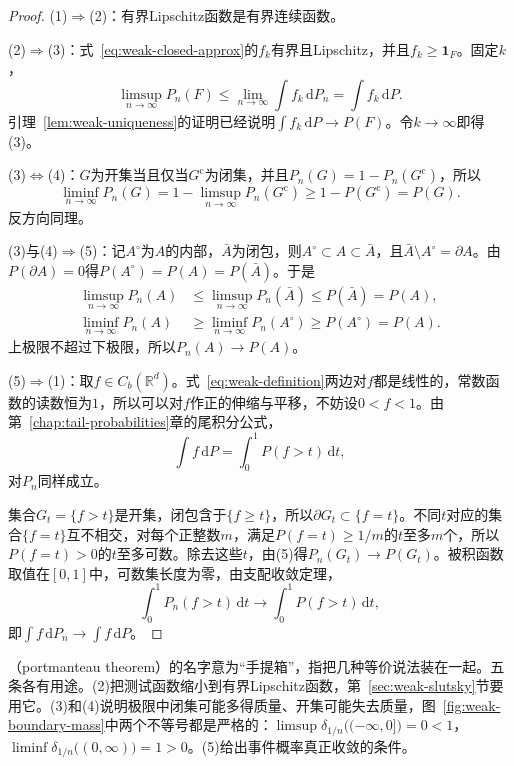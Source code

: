 \begin{proof}
(1)$\Rightarrow$(2)：有界Lipschitz函数是有界连续函数。

(2)$\Rightarrow$(3)：式~\eqref{eq:weak-closed-approx}的$f_k$有界且Lipschitz，并且$f_k\geq\mathbf{1}_F$。固定$k$，
\[
 \limsup_{n\to\infty}P_n(F)\leq\lim_{n\to\infty}\int f_k\,\mathrm{d}P_n=\int f_k\,\mathrm{d}P .
\]
引理~\ref{lem:weak-uniqueness}的证明已经说明$\int f_k\,\mathrm{d}P\to P(F)$。令$k\to\infty$即得(3)。

(3)$\Leftrightarrow$(4)：$G$为开集当且仅当$G^{\mathrm{c}}$为闭集，并且$P_n(G)=1-P_n(G^{\mathrm{c}})$，所以
\[
 \liminf_{n\to\infty}P_n(G)=1-\limsup_{n\to\infty}P_n(G^{\mathrm{c}})\geq1-P(G^{\mathrm{c}})=P(G) .
\]
反方向同理。

(3)与(4)$\Rightarrow$(5)：记$A^{\circ}$为$A$的内部，$\bar{A}$为闭包，则$A^{\circ}\subset A\subset\bar{A}$，且$\bar{A}\setminus A^{\circ}=\partial A$。由$P(\partial A)=0$得$P(A^{\circ})=P(A)=P(\bar{A})$。于是
\[
 \begin{aligned}
 \limsup_{n\to\infty}P_n(A)&\leq\limsup_{n\to\infty}P_n(\bar{A})\leq P(\bar{A})=P(A),\\
 \liminf_{n\to\infty}P_n(A)&\geq\liminf_{n\to\infty}P_n(A^{\circ})\geq P(A^{\circ})=P(A) .
 \end{aligned}
\]
上极限不超过下极限，所以$P_n(A)\to P(A)$。

(5)$\Rightarrow$(1)：取$f\in C_b(\mathbb{R}^{d})$。式~\eqref{eq:weak-definition}两边对$f$都是线性的，常数函数的读数恒为$1$，所以可以对$f$作正的伸缩与平移，不妨设$0<f<1$。由第~\ref{chap:tail-probabilities}章的尾积分公式，
\[
 \int f\,\mathrm{d}P=\int_0^1P(f>t)\,\mathrm{d}t ,
\]
对$P_n$同样成立。

集合$G_t=\{f>t\}$是开集，闭包含于$\{f\geq t\}$，所以$\partial G_t\subset\{f=t\}$。不同$t$对应的集合$\{f=t\}$互不相交，对每个正整数$m$，满足$P(f=t)\geq1/m$的$t$至多$m$个，所以$P(f=t)>0$的$t$至多可数。除去这些$t$，由(5)得$P_n(G_t)\to P(G_t)$。被积函数取值在$[0,1]$中，可数集长度为零，由支配收敛定理，
\[
 \int_0^1P_n(f>t)\,\mathrm{d}t\longrightarrow\int_0^1P(f>t)\,\mathrm{d}t ,
\]
即$\int f\,\mathrm{d}P_n\to\int f\,\mathrm{d}P$。
\end{proof}

（portmanteau theorem）的名字意为“手提箱”，指把几种等价说法装在一起。五条各有用途。(2)把测试函数缩小到有界Lipschitz函数，第~\ref{sec:weak-slutsky}节要用它。(3)和(4)说明极限中闭集可能多得质量、开集可能失去质量，图~\ref{fig:weak-boundary-mass}中两个不等号都是严格的：$\limsup\delta_{1/n}\bigl((-\infty,0]\bigr)=0<1$，$\liminf\delta_{1/n}\bigl((0,\infty)\bigr)=1>0$。(5)给出事件概率真正收敛的条件。

